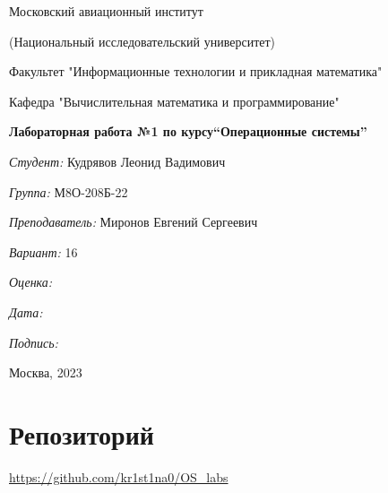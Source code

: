 \documentclass[a4paper, 12pt]{article}
\begin{document}
\thispagestyle{empty}	
\begin{center}
	Московский авиационный институт
	
	(Национальный исследовательский университет)
	
	Факультет "Информационные технологии и прикладная математика"
	
	Кафедра "Вычислительная математика и программирование"
	
\end{center}
\vspace{40ex}
\begin{center}
	\textbf{\large{Лабораторная работа №1 по курсу\linebreak \textquotedblleft Операционные системы\textquotedblright}}
\end{center}
\vspace{35ex}
\begin{flushright}
	\textit{Студент: } Кудрявов Леонид Вадимович
	
	\vspace{2ex}
	\textit{Группа: } М8О-208Б-22
	
	\vspace{2ex}
	\textit{Преподаватель: } Миронов Евгений Сергеевич
	
	\vspace{2ex}
	\textit{Вариант: } 16 
	
	\vspace{2ex}
	\textit{Оценка: } \underline{\quad\quad\quad\quad\quad\quad}
	
	 \vspace{2ex}
	\textit{Дата: } \underline{\quad\quad\quad\quad\quad\quad}
	
	\vspace{2ex}
	\textit{Подпись: } \underline{\quad\quad\quad\quad\quad\quad}
	
\end{flushright}

\vspace{5ex}

\begin{vfill}
	\begin{center}
		Москва, 2023
	\end{center}	
\end{vfill}
\newpage


\begingroup
\color{black}
\tableofcontents\newpage
\endgroup

\section{Репозиторий}
\href{https://github.com/kr1st1na0/OS\_labs}{https://github.com/kr1st1na0/OS\_labs}
\end{document}
